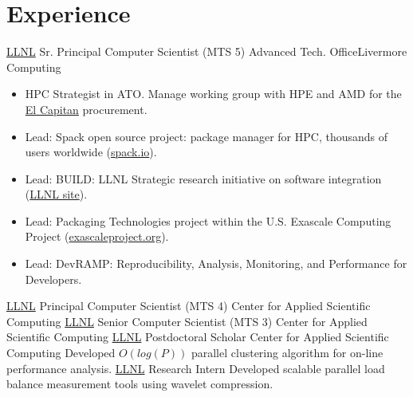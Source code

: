 \section{Experience}
		{\href{http://www.llnl.gov}{LLNL}}
		{Sr. Principal Computer Scientist (MTS 5)}
		{Advanced Tech. Office}{Livermore Computing}
		{
                  \begin{itemize}
                  \item HPC Strategist in ATO. Manage working group with HPE and AMD for the \href{https://www.llnl.gov/news/llnl-and-hpe-partner-amd-el-capitan-projected-worlds-fastest-supercomputer}{El Capitan} procurement.
                  \item Lead: Spack open source project: package manager for HPC, thousands of users worldwide (\href{https://spack.io}{spack.io}).
                  \item Lead: BUILD: LLNL Strategic research initiative on software integration (\href{https://computing.llnl.gov/projects/build}{LLNL site}).
                  \item Lead: Packaging Technologies project within the U.S. Exascale Computing Project (\href{https://exascaleproject.org}{exascaleproject.org}).
                  \item Lead: DevRAMP: Reproducibility, Analysis, Monitoring, and Performance for Developers.
                \end{itemize}
                }
		{\href{http://www.llnl.gov}{LLNL}}
		{Principal Computer Scientist (MTS 4)}
		{Center for Applied Scientific Computing}
                {}{}
		{\href{http://www.llnl.gov}{LLNL}}
		{Senior Computer Scientist (MTS 3)}
		{Center for Applied Scientific Computing}
                {}{}
		{\href{http://www.llnl.gov}{LLNL}}
		{Postdoctoral Scholar}
		{Center for Applied Scientific Computing}{}
		{Developed $O(log(P))$ parallel clustering algorithm for on-line performance analysis.
		 }
		{\href{http://www.llnl.gov}{LLNL}}
		{Research Intern}
		{}{}
		{Developed scalable parallel load balance measurement tools using wavelet compression.}

